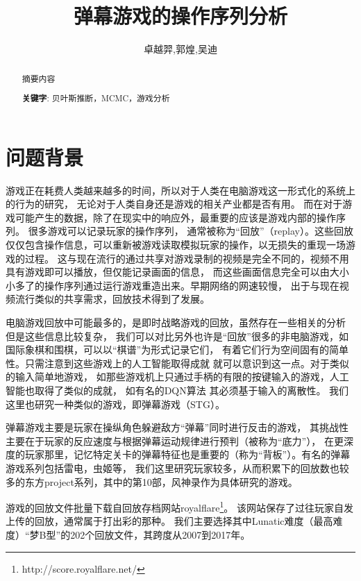 \documentclass[UTF8]{ctexart}
\title{弹幕游戏的操作序列分析}
\author{卓越羿,郭煌,吴迪}
\begin{document}
\maketitle
\begin{abstract}

摘要内容

\textbf{关键字}: 贝叶斯推断，MCMC，游戏分析


\end{abstract}

\section{问题背景}

游戏正在耗费人类越来越多的时间，所以对于人类在电脑游戏这一形式化的系统上的行为的研究，
无论对于人类自身还是游戏的相关产业都是否有用。
而在对于游戏可能产生的数据，除了在现实中的响应外，最重要的应该是游戏内部的操作序列。
很多游戏可以记录玩家的操作序列，
通常被称为“回放”（replay）。这些回放仅仅包含操作信息，可以重新被游戏读取模拟玩家的操作，以无损失的重现一场游戏的过程。
这与现在流行的通过共享对游戏录制的视频是完全不同的，视频不用具有游戏即可以播放，但仅能记录画面的信息，
而这些画面信息完全可以由大小小多了的操作序列通过运行游戏重造出来。早期网络的网速较慢，
出于与现在视频流行类似的共享需求，回放技术得到了发展。

电脑游戏回放中可能最多的，是即时战略游戏的回放，虽然存在一些相关的分析
\cite{starcraft}
但是这些信息比较复杂，
我们可以对比另外也许是“回放”很多的非电脑游戏，如国际象棋和围棋，可以以“棋谱”为形式记录它们，
有着它们行为空间固有的简单性。只需注意到这些游戏上的人工智能取得成就
\cite{alphago}
就可以意识到这一点。对于类似的输入简单地游戏，
如那些游戏机上只通过手柄的有限的按键输入的游戏，人工智能也取得了类似的成就，
如有名的DQN算法
\cite{atari}
其必须基于输入的离散性。
我们这里也研究一种类似的游戏，即弹幕游戏（STG）。

弹幕游戏主要是玩家在操纵角色躲避敌方“弹幕”同时进行反击的游戏，
其挑战性主要在于玩家的反应速度与根据弹幕运动规律进行预判（被称为“底力”），
在更深度的玩家那里，记忆特定关卡的弹幕特征也是重要的（称为“背板”）。有名的弹幕游戏系列包括雷电，虫姬等，
我们这里研究玩家较多，从而积累下的回放数也较多的东方project系列，其中的第10部，风神录作为具体研究的游戏。

游戏的回放文件批量下载自回放存档网站royalflare\footnote{ http://score.royalflare.net/ }。
该网站保存了过往玩家自发上传的回放，通常属于打出彩的那种。
我们主要选择其中Lunatic难度（最高难度）“梦B型”的202个回放文件，其跨度从2007到2017年。
\end{document}
